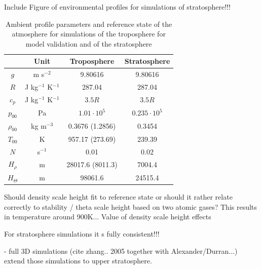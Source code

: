 \begin{table}[ht]
\centering
\caption{Ambient profile parameters and reference state of the atmosphere for simulations of the troposphere for model validation and of the stratosphere}


Include Figure of environmental profiles for simulations of stratosphere!!!


\begin{tabular}{@{}cccc@{}}
\toprule
 & Unit & Troposphere & Stratosphere \\ \midrule[1pt]

$g$ & m s$^{-2}$ & 9.80616 & 9.80616 \\
$R$ & J kg$^{-1}$ K$^{-1}$ & 287.04 & 287.04 \\
$c_p$ & J kg$^{-1}$ K$^{-1}$ & $3.5 R$ & $3.5 R$ \\
$p_{00}$ & Pa & $1.01 \cdot 10^5$ & $0.235 \cdot 10^5$ \\
$\rho_{00}$ & kg m$^{-3}$ & 0.3676 (1.2856) & 0.3454 \\
$T_{00}$ & K & 957.17 (273.69) & 239.39 \\
$N$ & s$^{-1}$ & 0.01 & 0.02 \\
$H_{\rho}$ & m & 28017.6 (8011.3)  & 7004.4 \\
$H_{\Theta}$ & m & 98061.6 & 24515.4  \\

\bottomrule
\end{tabular}
\label{tab:ambientProfiles}
\end{table}

Should density scale height fit to reference state or should it rather relate correctly to stability / theta scale height based on two atomic gases? This results in temperature around 900K...
Value of density scale height effects

For stratosphere simulations it s fully consistent!!! 

- full 3D simulations (cite zhang.. 2005 together with Alexander/Durran...) extend those simulations to upper stratosphere.



